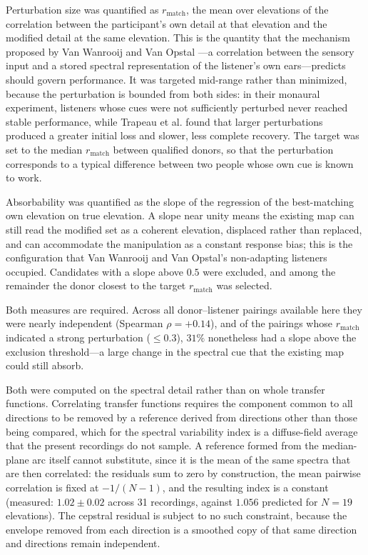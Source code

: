 Perturbation size was quantified as $r_\mathrm{match}$, the mean over elevations
of the correlation between the participant's own detail at that elevation and
the modified detail at the same elevation. This is the quantity that the
mechanism proposed by Van Wanrooij and Van Opstal
---a correlation between the sensory input and a stored spectral representation
of the listener's own ears---predicts should govern performance. It was targeted
mid-range rather than minimized, because the perturbation is bounded from both
sides: in their monaural experiment, listeners whose cues were not sufficiently
perturbed never reached stable performance, while Trapeau et al.
found that larger perturbations produced a greater initial loss and slower, less
complete recovery. The target was set to the median $r_\mathrm{match}$ between
qualified donors, so that the perturbation corresponds to a typical difference
between two people whose own cue is known to work.

Absorbability was quantified as the slope of the regression of the
best-matching own elevation on true elevation. A slope near unity means the
existing map can still read the modified set as a coherent elevation, displaced
rather than replaced, and can accommodate the manipulation as a constant
response bias; this is the configuration that Van Wanrooij and Van Opstal's
non-adapting listeners occupied. Candidates with a slope above $0.5$ were
excluded, and among the remainder the donor closest to the target
$r_\mathrm{match}$ was selected.

Both measures are required. Across all donor--listener pairings available here
they were nearly independent (Spearman $\rho = +0.14$), and of the pairings
whose $r_\mathrm{match}$ indicated a strong perturbation ($\leq 0.3$), $31\%$
nonetheless had a slope above the exclusion threshold---a large change in the
spectral cue that the existing map could still absorb.

Both were computed on the spectral detail rather than on whole transfer
functions. Correlating transfer functions requires the component common to all
directions to be removed by a reference derived from directions other than those
being compared, which for the spectral variability index
is a diffuse-field average that the present recordings do not sample. A
reference formed from the median-plane arc itself cannot substitute, since it is
the mean of the same spectra that are then correlated: the residuals sum to zero
by construction, the mean pairwise correlation is fixed at $-1/(N-1)$, and the
resulting index is a constant (measured: $1.02 \pm 0.02$ across 31 recordings,
against $1.056$ predicted for $N = 19$ elevations). The cepstral residual is
subject to no such constraint, because the envelope removed from each direction
is a smoothed copy of that same direction and directions remain independent.

